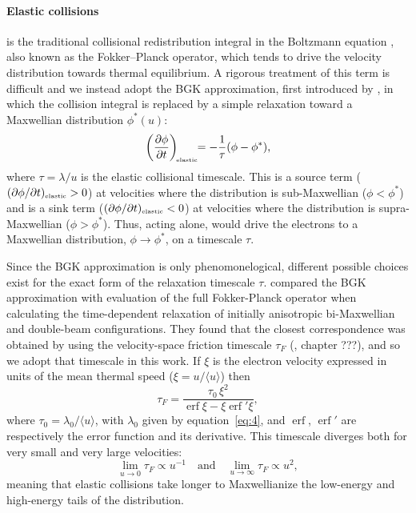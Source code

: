 \documentclass{emulateapj}
\newcommand\ubar{\ensuremath{\langle u \rangle}}
\begin{document}
\paragraph{Elastic collisions}  is the traditional
collisional redistribution integral in the Boltzmann equation
\citep[e.g.,][]{Pitaevskii:1981a}, also known as the Fokker--Planck
operator, which tends to drive the velocity distribution towards
thermal equilibrium.  A rigorous treatment of this term is difficult
and we instead adopt the BGK approximation, first introduced by
\citet{Bhatnagar:1954a}, in which the collision integral is replaced
by a simple relaxation toward a Maxwellian distribution \(\phi^*(u)\):
\begin{equation}
  \label{eq:2}
  \biggl( \frac{\partial \phi}{\partial t} \biggr)_{\!\scriptscriptstyle\mathrm{elastic}} \!\!= -\frac{1}{\tau} (\phi - \phi^*) ,
\end{equation}
where \(\tau = \lambda/u\) is the elastic collisional timescale. 
This is a source term (\((\partial \phi/\partial t)_{\scriptscriptstyle\mathrm{elastic}} > 0\)) at velocities where
the distribution is sub-Maxwellian (\(\phi < \phi^*\)) and is a sink
term (\((\partial \phi/\partial t)_{\scriptscriptstyle\mathrm{elastic}} < 0\)) at velocities where the distribution
is supra-Maxwellian (\(\phi > \phi^*\)).  Thus, acting alone,
 would drive the electrons to a Maxwellian
distribution, \(\phi \to \phi^*\), on a timescale \(\tau\). 

Since the BGK approximation is only phenomonelogical, different
possible choices exist for the exact form of the relaxation timescale
\(\tau\).
\citet{Livi:1986a} compared the BGK approximation with evaluation of
the full Fokker-Planck operator when calculating the time-dependent
relaxation of initially anisotropic bi-Maxwellian and double-beam
configurations.  They found that the closest correspondence was
obtained by using the velocity-space friction timescale \(\tau_{F}\)
(\citealp{Spitzer:1956a}, chapter ???), and so we adopt that timescale
in this work.  If \(\xi\) is the electron velocity
expressed in units of the mean thermal speed (\(\xi = u /\ubar\)) then
\newcommand\erf{\operatorname{erf}}
\begin{equation}
  \label{eq:3}
  \tau_{F} = \frac{\tau_0 \, \xi^2}{\erf\xi - \xi\erf'\!\xi}, 
\end{equation}
where \(\tau_0 = \lambda_0 / \ubar\), with \(\lambda_0\) given by
equation~\eqref{eq:4}, and \(\erf\), \(\erf'\) are respectively the
error function and its derivative. This timescale diverges both
for very small and very large velocities:
\begin{equation}
  \label{eq:5}
  \lim_{u \to 0} \tau_{F} \propto u^{-1} \quad \mathrm{and} \quad
  \lim_{u \to \infty} \tau_{F} \propto u^{2} , 
\end{equation}
meaning that elastic collisions take longer to Maxwellianize the
low-energy and high-energy tails of the distribution. 
\end{document}
